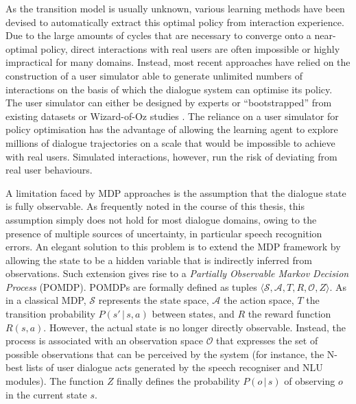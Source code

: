 As the transition model is usually unknown, various learning methods have been devised to automatically extract this optimal policy from interaction experience. Due to the large amounts of cycles that are necessary to converge onto a near-optimal policy, direct interactions with real users are often impossible or highly impractical for many domains. Instead, most recent approaches have relied on the construction of a user simulator able to generate unlimited numbers of interactions on the basis of which the dialogue system can optimise its policy.  
The user simulator can either be designed by experts  or ``bootstrapped'' from existing datasets  or Wizard-of-Oz studies \citep{InTech_RL_2008_OP,FramptonL09,RieserLemon11}. The reliance on a user simulator for policy optimisation has the advantage of allowing the learning agent to explore millions of dialogue trajectories on a scale that would be impossible to achieve with real users.  Simulated interactions, however, run the risk of deviating from real user behaviours.

A limitation faced by MDP approaches is the assumption that the dialogue state is fully observable. As frequently noted in the course of this thesis, this assumption simply does not hold for most dialogue domains, owing to the presence of multiple sources of uncertainty, in particular speech recognition errors.  An elegant solution to this problem is to extend the MDP framework by allowing the state to be a hidden variable that is indirectly inferred from observations.  Such extension gives rise to a  \textit{Partially Observable Markov Decision Process} (POMDP).  POMDPs are formally defined as tuples $\langle \mathcal{S}, \mathcal{A}, T, R, \mathcal{O}, Z \rangle$.  As in a classical MDP, $\mathcal{S}$ represents the state space, $\mathcal{A}$ the action space, $T$ the transition probability $P(s'\, | \, s,a)$ between states, and $R$ the reward function $R(s,a)$.  However, the actual state is no longer directly observable.  Instead, the process is associated with an observation space $\mathcal{O}$ that expresses the set of possible observations that can be perceived by the system (for instance, the N-best lists of user dialogue acts generated by the speech recogniser and NLU modules). The function $Z$ finally defines the probability $P(o\, | \, s)$ of observing $o$ in the current state $s$.  

